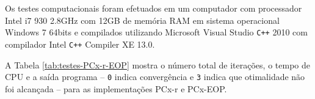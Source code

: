 
Os testes computacionais foram efetuados em um computador com processador Intel i7 930 2.8GHz com \num{12}GB de memória RAM em sistema operacional Windows 7 \num{64}bits e compilados utilizando Microsoft Visual Studio \texttt{C++} 2010 com compilador Intel \texttt{C++} Compiler  XE 13.0.

A Tabela \ref{tab:testes-PCx-r-EOP} mostra o número total de iterações, o tempo de CPU e a saída programa -- \texttt{0} indica convergência e \texttt{3} indica que otimalidade não foi alcançada -- para as implementações PCx-r e PCx-EOP. 









